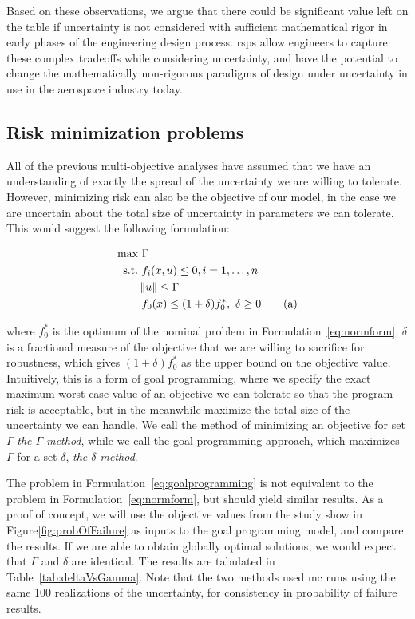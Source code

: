 Based on these observations, we argue that there could be significant value left on the table
if uncertainty is not considered with sufficient mathematical rigor in early phases of
the engineering design process. \gls{rsp}s allow engineers to capture these complex
tradeoffs while considering uncertainty, and have the potential to change
the mathematically non-rigorous paradigms of design under uncertainty in use
in the aerospace industry today.

\subsection{Risk minimization problems}

All of the previous multi-objective analyses have assumed that we have an
understanding of exactly the spread of the uncertainty we are
willing to tolerate. However, minimizing risk can also be the objective of our
model, in the case we are uncertain about the total size of uncertainty in parameters
we can tolerate. This would suggest the following formulation:

\begin{align*}
    \text{max} &~\Gamma \\
    \text{s.t.}     &~f_i(x,u) \leq 0, i = 1,\ldots,n \\
                    & \left\lVert u\right\rVert \leq \Gamma \\
                    &~f_0(x) \leq (1+\delta)f_0^*,~\delta \geq 0 \tag{a}
    \label{eq:goalprogramming}
\end{align*}

where $f_0^*$ is the optimum of the nominal problem in Formulation~\ref{eq:normform}, $\delta$
is a fractional measure of the objective that we are willing to sacrifice for robustness, which
gives $(1+\delta)f_0^*$ as the upper bound on the objective value. Intuitively,
this is a form of goal programming,
where we specify the exact maximum worst-case value of an objective we can tolerate so that the program
risk is acceptable, but in the meanwhile maximize the total size of the uncertainty we can handle.
We call the method of minimizing an objective for set ${\Gamma}$ \emph{the $\Gamma$ method},
while we call the goal programming approach, which maximizes $\Gamma$ for a set $\delta$,
\emph{the $\delta$ method}.

The problem in Formulation~\ref{eq:goalprogramming} is not equivalent to the problem in Formulation~\ref{eq:normform},
but should yield similar results. As a proof of concept, we will use the objective values from the study
show in Figure\ref{fig:probOfFailure} as inputs to the goal programming model, and compare the results.
If we are able to obtain globally
optimal solutions, we would expect that $\Gamma$ and $\delta$ are identical. The results are tabulated in
Table~\ref{tab:deltaVsGamma}. Note that the two methods used \gls{mc} runs using the same 100 realizations
of the uncertainty, for consistency in probability of failure results.

